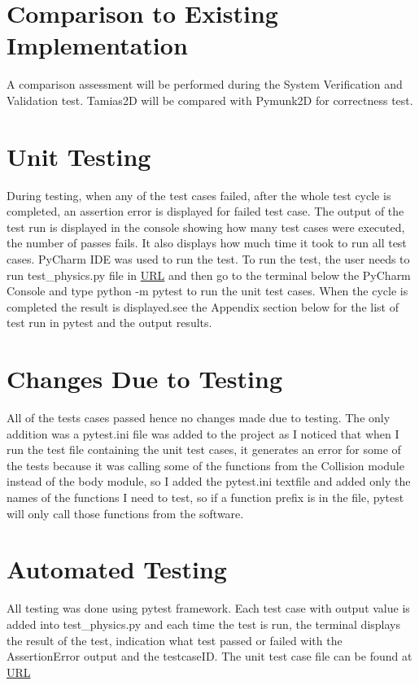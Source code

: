 \documentclass[12pt, titlepage]{article}
\begin{document}
\section{Comparison to Existing Implementation}	
A comparison assessment will be performed during the System Verification and Validation test. Tamias2D will be compared with Pymunk2D for correctness test.


\section{Unit Testing}
During testing, when any of the test cases failed, after the whole test cycle is completed, an assertion error is displayed for failed test case. The output of the test run is displayed in the console showing how many test cases were executed, the number of passes fails. It also displays how much time it took to run all test cases. PyCharm IDE was used to run the test. To run the test, the user needs to run test\_physics.py file in \url{URL} and then go to the terminal below the PyCharm Console and type python -m pytest to run the unit test cases. When the cycle is completed the result is displayed.see the Appendix section below for the list of test run in pytest and the output results.
\section{Changes Due to Testing}
All of the tests cases passed hence no changes made due to testing. The only addition was a pytest.ini file was added to the project as I noticed that when I run the test file containing the unit test cases, it generates an error for some of the tests because it was calling some of the functions from the Collision module instead of the body module, so I added the pytest.ini textfile and added only the names of the functions I need to test, so if a function prefix is in the file, pytest will only call those functions from the software.
\section{Automated Testing}

All testing was done using pytest framework. Each test case with output value is added into test\_physics.py and each time the test is run, the terminal displays the result of the test, indication what test passed or failed with the AssertionError output and the testcaseID. The unit test case file can be found at \url{URL}
	
\end{document}
